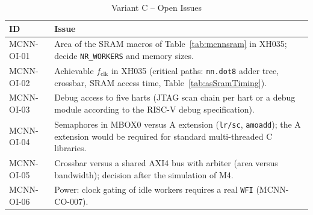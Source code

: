 \begin{table}[H]
\caption{Variant C -- Open Issues}
\label{tab:mcnnopen}
\centering
{\footnotesize
\begin{tabularx}{\textwidth}{|l |X|}
  \hline
  ID & Issue \\
  \hline
  \hline
  MCNN-OI-01 & Area of the SRAM macros of Table~\ref{tab:mcnnsram} in XH035;
    decide \texttt{NR\_WORKERS} and memory sizes. \\
  \hline
  MCNN-OI-02 & Achievable $f_\text{clk}$ in XH035 (critical paths: \texttt{nn.dot8}
    adder tree, crossbar, SRAM access time, Table~\ref{tab:asSramTiming}). \\
  \hline
  MCNN-OI-03 & Debug access to five harts (JTAG scan chain per hart or a
    debug module according to the RISC-V debug specification). \\
  \hline
  MCNN-OI-04 & Semaphores in MBOX0 versus A extension (\texttt{lr/sc},
    \texttt{amoadd}); the A extension would be required for standard
    multi-threaded C libraries. \\
  \hline
  MCNN-OI-05 & Crossbar versus a shared AXI4 bus with arbiter
    (area versus bandwidth); decision after the simulation of M4. \\
  \hline
  MCNN-OI-06 & Power: clock gating of idle workers requires a real
    \texttt{WFI} (MCNN-CO-007). \\
  \hline
\end{tabularx}}
\end{table}
